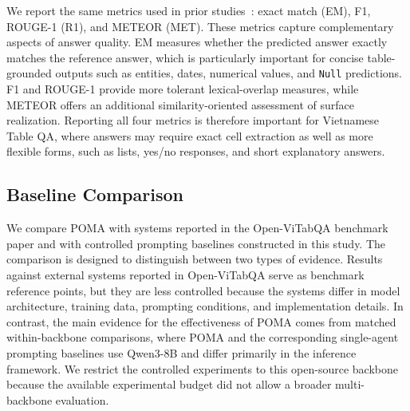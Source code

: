 \documentclass[]{interact}
\begin{document}
We report the same metrics used in prior studies~\citep{openvitabqa2025,lin-2004-rouge,banerjee-lavie-2005-meteor}: exact match (EM), F1, ROUGE-1 (R1), and METEOR (MET). These metrics capture complementary aspects of answer quality. EM measures whether the predicted answer exactly matches the reference answer, which is particularly important for concise table-grounded outputs such as entities, dates, numerical values, and \texttt{Null} predictions. F1 and ROUGE-1 provide more tolerant lexical-overlap measures, while METEOR offers an additional similarity-oriented assessment of surface realization. Reporting all four metrics is therefore important for Vietnamese Table QA, where answers may require exact cell extraction as well as more flexible forms, such as lists, yes/no responses, and short explanatory answers.


\subsection{Baseline Comparison}

We compare POMA with systems reported in the Open-ViTabQA benchmark paper and with controlled prompting baselines constructed in this study. The comparison is designed to distinguish between two types of evidence. Results against external systems reported in Open-ViTabQA serve as benchmark reference points, but they are less controlled because the systems differ in model architecture, training data, prompting conditions, and implementation details. In contrast, the main evidence for the effectiveness of POMA comes from matched within-backbone comparisons, where POMA and the corresponding single-agent prompting baselines use Qwen3-8B and differ primarily in the inference framework. We restrict the controlled experiments to this open-source backbone because the available experimental budget did not allow a broader multi-backbone evaluation.
\end{document}
